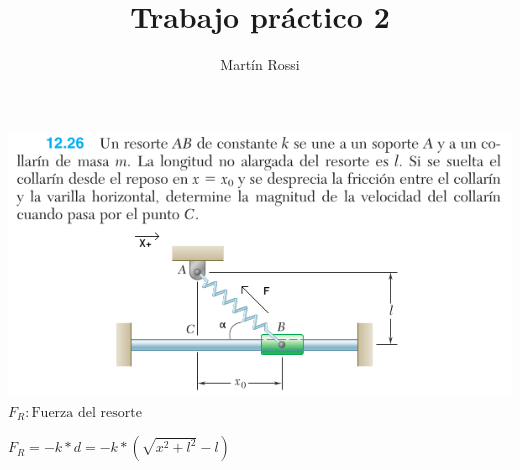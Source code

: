 \documentclass[12pt,fleqn]{article}
\title{\LARGE \textbf{Trabajo práctico 2}}
\author{Martín Rossi}
\date{}
\begin{document}
\maketitle
\includegraphics[width=\linewidth]{12.26}
\newpage
$F_R: \textrm{Fuerza del resorte}$

$F_R=-k*d=-k*(\sqrt{x^2+l^2}-l)$
\end{document}
